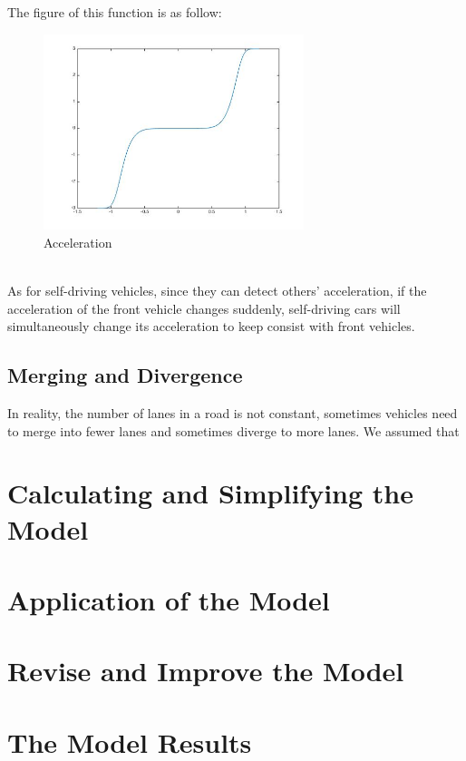 \documentclass{icmmcm}
\begin{document}
\\
\\
The figure of this function is as follow:\\
\begin{figure}[!htp]
\centering
\includegraphics[height=5.7cm]{Acceleration.jpg}
\caption{Acceleration}
\end{figure}
\\
As for self-driving vehicles, since they can detect others' acceleration, if the acceleration of the front vehicle changes suddenly, self-driving cars will simultaneously change its acceleration to keep consist with front vehicles.\\
\subsection{Merging and Divergence}
In reality, the number of lanes in a road is not constant, sometimes vehicles need to merge into fewer lanes and sometimes diverge to more lanes. We assumed that 
\section{Calculating and Simplifying the Model}
\section{Application of the Model}%
\section{Revise and Improve the Model}
\section{The Model Results}
\subsection{}
\end{document}
